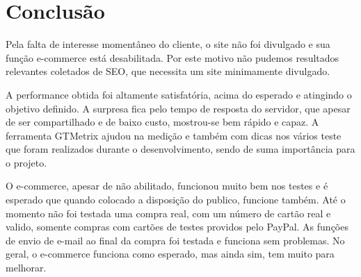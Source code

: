 \chapter{Conclusão}

Pela falta de interesse momentâneo do cliente, o site não foi divulgado e sua função e-commerce está desabilitada. Por este motivo não pudemos resultados relevantes coletados de SEO, que necessita um site minimamente divulgado.

A performance obtida foi altamente satisfatória, acima do esperado e atingindo o objetivo definido. A surpresa fica pelo tempo de resposta do servidor, que apesar de ser compartilhado e de baixo custo, mostrou-se bem rápido e capaz. A ferramenta GTMetrix ajudou na medição e também com dicas nos vários teste que foram realizados durante o desenvolvimento, sendo de suma importância para o projeto.

O e-commerce, apesar de não abilitado, funcionou muito bem nos testes e é esperado que quando colocado a disposição do publico, funcione também. Até o momento não foi testada uma compra real, com um número de cartão real e valido, somente compras com cartões de testes providos pelo PayPal. As funções de envio de e-mail ao final da compra foi testada e funciona sem problemas. No geral, o e-commerce funciona como esperado, mas ainda sim, tem muito para melhorar.